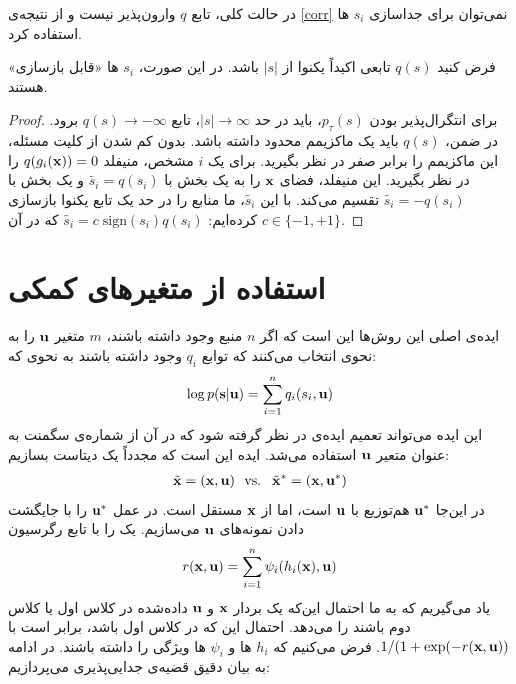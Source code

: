 \documentclass[oneside]{thesis}
\begin{document}
\begin{note}
	در حالت کلی، تابع $q$ وارون‌پذیر نیست و از نتیجه‌ی
	\eqref{corr}
	نمی‌توان برای جداسازی 
	$s_i$
	ها استفاده کرد.
\end{note}
\begin{corollary}
	فرض کنید 
	$q(s)$
	تابعی اکیداً یکنوا از 
	$|s|$
	باشد. در این صورت،  $s_i$ ها «قابل بازسازی» هستند.
\end{corollary}
\begin{proof}
	برای انتگرال‌پذیر بودن
	$p_\tau(s)$،
	باید در حد
	$|s| \to \infty$،
	تابع
	$q(s) \to -\infty$
	برود.  در ضمن،
	$q(s)$
	باید یک ماکزیمم محدود داشته باشد. بدون کم شدن از کلیت مسئله، این ماکزیمم را برابر صفر در نظر بگیرید. برای یک $i$ مشخص، منیفلد
	$q(g_i(\mathbf{x})) = 0$
	را در نظر بگیرید. این منیفلد، فضای 
	$\mathbf{x}$
	را به یک بخش با 
	$\tilde{s_i} = q(s_i)$
	و یک بخش با 
	$\tilde{s_i} = -q(s_i)$
	تقسیم می‌کند. با این 
	$\tilde{s_i}$،
	ما منابع را در حد یک تابع یکنوا بازسازی کرده‌ایم:
	$\tilde{s_i} = c \;\mathrm{sign}(s_i)q(s_i)$
	که در آن 
	$c \in \{-1, +1\}$.
\end{proof}

\section{استفاده از متغیر‌های کمکی}

ایده‌ی اصلی این روش‌ها این است که اگر 
$n$
منبع وجود داشته باشند، $m$ متغیر 
$\mathbf{u}$
را به نحوی انتخاب می‌کنند که توابع 
$q_i$
وجود داشته باشند به نحوی که:
\begin{equation}
\log p(\mathbf{s}|\mathbf{u}) = \sum_{i = 1}^{n} q_i(s_i, \mathbf{u})
\label{genprior}
\end{equation}
این ایده‌ می‌تواند تعمیم ایده‌ی 
در نظر گرفته شود که در آن از شماره‌ی سگمنت به عنوان متعیر 
$\mathbf{u}$
استفاده می‌شد. ایده‌ این است که مجدداً یک دیتاست بسازیم:
\begin{align}
\tilde{\mathbf{x}}=(\mathbf{x},\mathbf{u})  \  \text{ vs. } \
\tilde{\mathbf{x}}^*=(\mathbf{x},\mathbf{u}^*) \label{xtildestar}
\end{align}
در این‌جا 
$\mathbf{u}^*$
هم‌توزیع با 
$\mathbf{u}$
است، اما از 
$\mathbf{x}$
مستقل است. در عمل 
$\mathbf{u}^*$
را با جایگشت دادن نمونه‌های 
$\mathbf{u}$
می‌سازیم. یک
را با تابع رگرسیون
\begin{equation} \label{reggen}
r(\mathbf{x},\mathbf{u})= \sum_{i=1}^n \psi_i(h_i(\mathbf{x}),\mathbf{u})
\end{equation}
یاد می‌گیریم که به ما احتمال این‌که یک بردار 
$\mathbf{x}$
و 
$\mathbf{u}$
داده‌شده  در کلاس اول یا کلاس دوم باشند را می‌دهد. احتمال این که در کلاس اول باشد، برابر است با
$1/(1+\exp(-r(\mathbf{x},\mathbf{u}))$.
فرض می‌کنیم که 
$h_i$
ها و 
$\psi_i$
ها ویژگی
را داشته باشند. در ادامه به بیان دقیق قضیه‌ی جدایی‌پذیری  می‌پردازیم:
\end{document}
